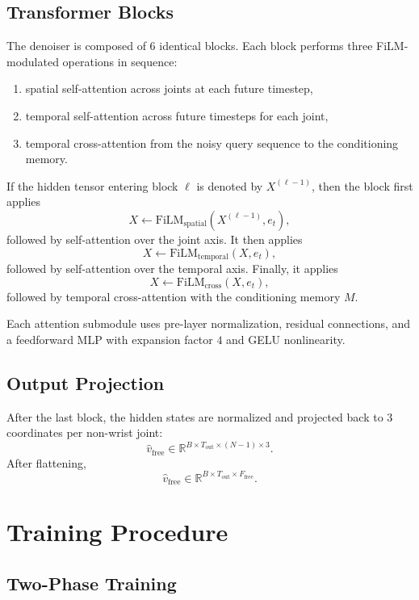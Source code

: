 \documentclass[11pt]{article}
\begin{document}
\subsection{Transformer Blocks}

The denoiser is composed of $6$ identical blocks. Each block performs three FiLM-modulated operations in sequence:

\begin{enumerate}
\item spatial self-attention across joints at each future timestep,
\item temporal self-attention across future timesteps for each joint,
\item temporal cross-attention from the noisy query sequence to the conditioning memory.
\end{enumerate}

If the hidden tensor entering block $\ell$ is denoted by $X^{(\ell-1)}$, then the block first applies
\[
X \leftarrow \mathrm{FiLM}_{\mathrm{spatial}}(X^{(\ell-1)}, e_t),
\]
followed by self-attention over the joint axis. It then applies
\[
X \leftarrow \mathrm{FiLM}_{\mathrm{temporal}}(X, e_t),
\]
followed by self-attention over the temporal axis. Finally, it applies
\[
X \leftarrow \mathrm{FiLM}_{\mathrm{cross}}(X, e_t),
\]
followed by temporal cross-attention with the conditioning memory $M$.

Each attention submodule uses pre-layer normalization, residual connections, and a feedforward MLP with expansion factor $4$ and GELU nonlinearity.

\subsection{Output Projection}

After the last block, the hidden states are normalized and projected back to $3$ coordinates per non-wrist joint:
\[
\hat{v}_{\mathrm{free}} \in \mathbb{R}^{B \times T_{\mathrm{out}} \times (N-1) \times 3}.
\]
After flattening,
\[
\hat{v}_{\mathrm{free}} \in \mathbb{R}^{B \times T_{\mathrm{out}} \times F_{\mathrm{free}}}.
\]

\section{Training Procedure}

\subsection{Two-Phase Training}
\end{document}
